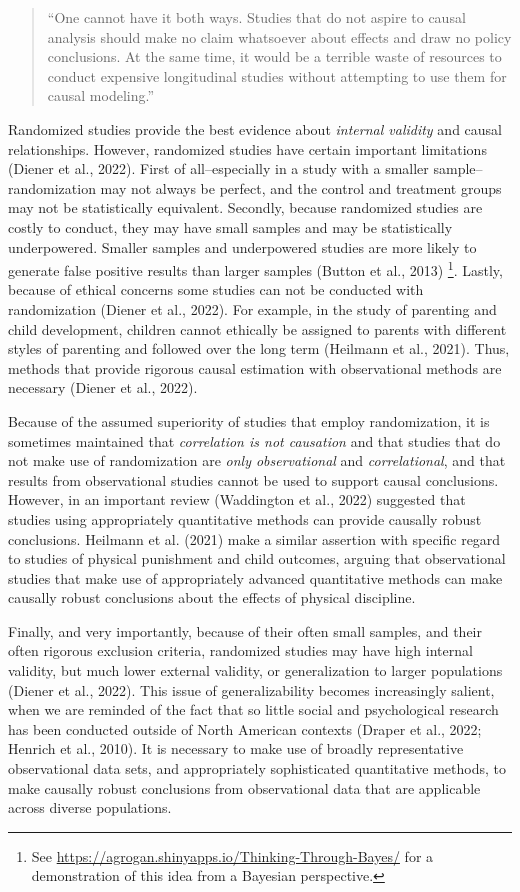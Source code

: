 \documentclass[
  letterpaper,
  DIV=11,
  numbers=noendperiod]{scrreprt}
\begin{document}
\begin{quote}
``One cannot have it both ways. Studies that do not aspire to causal
analysis should make no claim whatsoever about effects and draw no
policy conclusions. At the same time, it would be a terrible waste of
resources to conduct expensive longitudinal studies without attempting
to use them for causal modeling.''
\end{quote}

Randomized studies provide the best evidence about \emph{internal
validity} and causal relationships. However, randomized studies have
certain important limitations (Diener et al., 2022). First of
all--especially in a study with a smaller sample--randomization may not
always be perfect, and the control and treatment groups may not be
statistically equivalent. Secondly, because randomized studies are
costly to conduct, they may have small samples and may be statistically
underpowered. Smaller samples and underpowered studies are more likely
to generate false positive results than larger samples (Button et al.,
2013) \footnote{See
  \url{https://agrogan.shinyapps.io/Thinking-Through-Bayes/} for a
  demonstration of this idea from a Bayesian perspective.}. Lastly,
because of ethical concerns some studies can not be conducted with
randomization (Diener et al., 2022). For example, in the study of
parenting and child development, children cannot ethically be assigned
to parents with different styles of parenting and followed over the long
term (Heilmann et al., 2021). Thus, methods that provide rigorous causal
estimation with observational methods are necessary (Diener et al.,
2022).

Because of the assumed superiority of studies that employ randomization,
it is sometimes maintained that \emph{correlation is not causation} and
that studies that do not make use of randomization are \emph{only
observational} and \emph{correlational}, and that results from
observational studies cannot be used to support causal conclusions.
However, in an important review (Waddington et al., 2022) suggested that
studies using appropriately quantitative methods can provide causally
robust conclusions. Heilmann et al. (2021) make a similar assertion with
specific regard to studies of physical punishment and child outcomes,
arguing that observational studies that make use of appropriately
advanced quantitative methods can make causally robust conclusions about
the effects of physical discipline.

Finally, and very importantly, because of their often small samples, and
their often rigorous exclusion criteria, randomized studies may have
high internal validity, but much lower external validity, or
generalization to larger populations (Diener et al., 2022). This issue
of generalizability becomes increasingly salient, when we are reminded
of the fact that so little social and psychological research has been
conducted outside of North American contexts (Draper et al., 2022;
Henrich et al., 2010). It is necessary to make use of broadly
representative observational data sets, and appropriately sophisticated
quantitative methods, to make causally robust conclusions from
observational data that are applicable across diverse populations.
\end{document}
